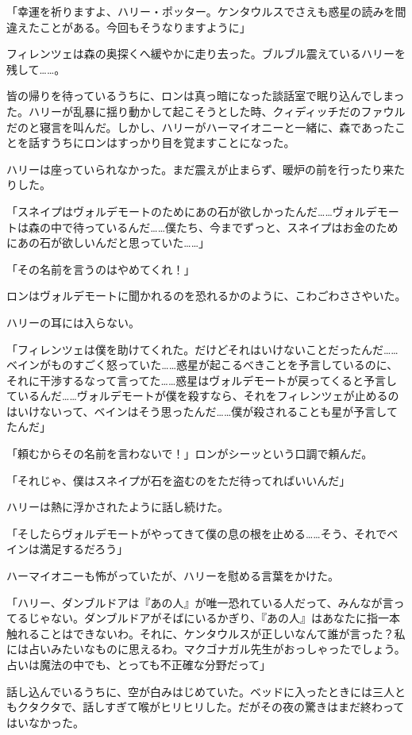 \documentclass[10pt,a4paper]{article}
\begin{document}
\begin{CJK}{UTF8}{min}
「幸運を祈りますよ、ハリー・ポッター。ケンタウルスでさえも惑星の読みを間違えたことがある。今回もそうなりますように」

フィレンツェは森の奥探くへ緩やかに走り去った。ブルブル震えているハリーを残して……。

皆の帰りを待っているうちに、ロンは真っ暗になった談話室で眠り込んでしまった。ハリーが乱暴に揺り動かして起こそうとした時、クィディッチだのファウルだのと寝言を叫んだ。しかし、ハリーがハーマイオニーと一緒に、森であったことを話すうちにロンはすっかり目を覚ますことになった。

ハリーは座っていられなかった。まだ震えが止まらず、暖炉の前を行ったり来たりした。

「スネイプはヴォルデモートのためにあの石が欲しかったんだ……ヴォルデモートは森の中で待っているんだ……僕たち、今までずっと、スネイプはお金のためにあの石が欲しいんだと思っていた……」

「その名前を言うのはやめてくれ！」

ロンはヴォルデモートに聞かれるのを恐れるかのように、こわごわささやいた。

ハリーの耳には入らない。

「フィレンツェは僕を助けてくれた。だけどそれはいけないことだったんだ……ベインがものすごく怒っていた……惑星が起こるべきことを予言しているのに、それに干渉するなって言ってた……惑星はヴォルデモートが戻ってくると予言しているんだ……ヴォルデモートが僕を殺すなら、それをフィレンツェが止めるのはいけないって、ベインはそう思ったんだ……僕が殺されることも星が予言してたんだ」

「頼むからその名前を言わないで！」ロンがシーッという口調で頼んだ。

「それじゃ、僕はスネイプが石を盗むのをただ待ってればいいんだ」

ハリーは熱に浮かされたように話し続けた。

「そしたらヴォルデモートがやってきて僕の息の根を止める……そう、それでベインは満足するだろう」

ハーマイオニーも怖がっていたが、ハリーを慰める言葉をかけた。

「ハリー、ダンブルドアは『あの人』が唯一恐れている人だって、みんなが言ってるじゃない。ダンブルドアがそばにいるかぎり、『あの人』はあなたに指一本触れることはできないわ。それに、ケンタウルスが正しいなんて誰が言った？私には占いみたいなものに思えるわ。マクゴナガル先生がおっしゃったでしょう。占いは魔法の中でも、とっても不正確な分野だって」

話し込んでいるうちに、空が白みはじめていた。ベッドに入ったときには三人ともクタクタで、話しすぎて喉がヒリヒリした。だがその夜の驚きはまだ終わってはいなかった。


\end{CJK}
\end{document}
